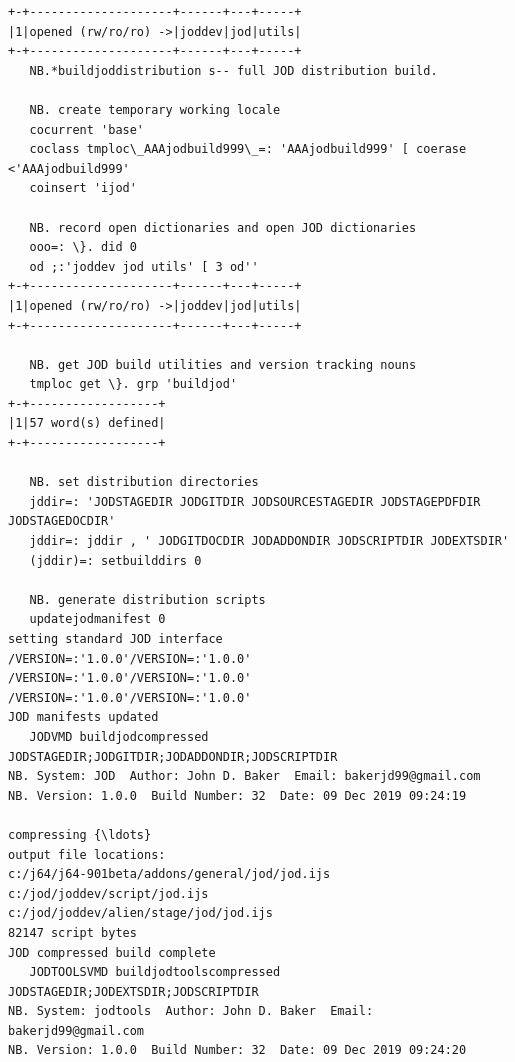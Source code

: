 \documentclass[11pt,letter,landscape]{article}
\begin{document}
    \begin{Verbatim}[commandchars=\\\{\}]
+-+--------------------+------+---+-----+
|1|opened (rw/ro/ro) ->|joddev|jod|utils|
+-+--------------------+------+---+-----+
   NB.*buildjoddistribution s-- full JOD distribution build.
   
   NB. create temporary working locale
   cocurrent 'base'
   coclass tmploc\_AAAjodbuild999\_=: 'AAAjodbuild999' [ coerase <'AAAjodbuild999'
   coinsert 'ijod'
   
   NB. record open dictionaries and open JOD dictionaries
   ooo=: \}. did 0
   od ;:'joddev jod utils' [ 3 od''
+-+--------------------+------+---+-----+
|1|opened (rw/ro/ro) ->|joddev|jod|utils|
+-+--------------------+------+---+-----+
   
   NB. get JOD build utilities and version tracking nouns
   tmploc get \}. grp 'buildjod'
+-+------------------+
|1|57 word(s) defined|
+-+------------------+
   
   NB. set distribution directories
   jddir=: 'JODSTAGEDIR JODGITDIR JODSOURCESTAGEDIR JODSTAGEPDFDIR JODSTAGEDOCDIR'
   jddir=: jddir , ' JODGITDOCDIR JODADDONDIR JODSCRIPTDIR JODEXTSDIR' 
   (jddir)=: setbuilddirs 0
   
   NB. generate distribution scripts
   updatejodmanifest 0
setting standard JOD interface
/VERSION=:'1.0.0'/VERSION=:'1.0.0'
/VERSION=:'1.0.0'/VERSION=:'1.0.0'
/VERSION=:'1.0.0'/VERSION=:'1.0.0'
JOD manifests updated
   JODVMD buildjodcompressed JODSTAGEDIR;JODGITDIR;JODADDONDIR;JODSCRIPTDIR
NB. System: JOD  Author: John D. Baker  Email: bakerjd99@gmail.com
NB. Version: 1.0.0  Build Number: 32  Date: 09 Dec 2019 09:24:19

compressing {\ldots} 
output file locations:
c:/j64/j64-901beta/addons/general/jod/jod.ijs
c:/jod/joddev/script/jod.ijs
c:/jod/joddev/alien/stage/jod/jod.ijs
82147 script bytes
JOD compressed build complete
   JODTOOLSVMD buildjodtoolscompressed JODSTAGEDIR;JODEXTSDIR;JODSCRIPTDIR
NB. System: jodtools  Author: John D. Baker  Email: bakerjd99@gmail.com
NB. Version: 1.0.0  Build Number: 32  Date: 09 Dec 2019 09:24:20


\end{Verbatim}
\end{document}
